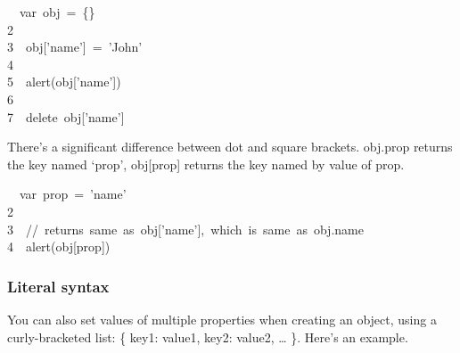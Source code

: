 \documentclass{article}
\begin{document}
\begin{mdpre}%
~~{var}~obj~=~\{\}\\
{2}\\
{3}~~obj{}[{'}{name}{'}]~=~{'}{John}{'}\\
{4}\\
{5}~~alert(obj{}[{'}{name}{'}])\\
{6}\\
{7}~~{delete}~obj{}[{'}{name}{'}]%
\end{mdpre}\noindent{}There's a significant difference between dot and square brackets.
obj.prop returns the key named \textquoteleft{}prop\textquoteright{},
obj[prop] returns the key named by value of prop. 
\begin{mdpre}%
~~{var}~prop~=~{'}{name}{'}\\
{2}\\
{3}~~{//~returns~same~as~obj{}['name'],~which~is~same~as~obj.name}\\
{4}~~alert(obj{}[prop])%
\end{mdpre}
\subsubsection{Literal syntax}\label{sec3-literal-syntax}%

\noindent{}You can also set values of multiple properties when creating an object, using a curly-bracketed list: \{ key1: value1, key2: value2, \dots{} \}.
Here's an example.  %
\end{document}
